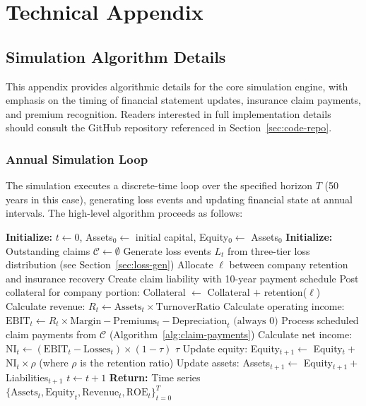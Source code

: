 \documentclass[11pt,letterpaper]{article}
\begin{document}



\pagebreak

\appendix
\section{Technical Appendix}

\subsection{Simulation Algorithm Details}

This appendix provides algorithmic details for the core simulation engine, with emphasis on the timing of financial statement updates, insurance claim payments, and premium recognition. Readers interested in full implementation details should consult the GitHub repository referenced in Section~\ref{sec:code-repo}.

\subsubsection{Annual Simulation Loop}

The simulation executes a discrete-time loop over the specified horizon $T$ (50 years in this case), generating loss events and updating financial state at annual intervals. The high-level algorithm proceeds as follows:

\begin{algorithmic}[1]
\State \textbf{Initialize:} $t \gets 0$, Assets$_0 \gets$ initial capital, Equity$_0 \gets$ Assets$_0$
\State \textbf{Initialize:} Outstanding claims $\mathcal{C} \gets \emptyset$
    \State Generate loss events $L_t$ from three-tier loss distribution (see Section~\ref{sec:loss-gen})
        \State Allocate $\ell$ between company retention and insurance recovery
        \State Create claim liability with 10-year payment schedule
        \State Post collateral for company portion: Collateral $\gets$ Collateral $+$ retention($\ell$)
    \EndFor
    \State Calculate revenue: $R_t \gets \text{Assets}_t \times \text{TurnoverRatio}$
    \State Calculate operating income: $\text{EBIT}_t \gets R_t \times \text{Margin} - \text{Premiums}_t - \text{Depreciation}_t \text{ (always 0)}$
    \State Process scheduled claim payments from $\mathcal{C}$ (Algorithm~\ref{alg:claim-payments})
    \State Calculate net income: $\text{NI}_t \gets (\text{EBIT}_t - \text{Losses}_t) \times (1 - \tau)$  $\tau$ 
    \State Update equity: Equity$_{t+1} \gets$ Equity$_t +$ NI$_t \times \rho$ (where $\rho$ is the retention ratio)
    \State Update assets: Assets$_{t+1} \gets$ Equity$_{t+1} +$ Liabilities$_{t+1}$
    \State $t \gets t + 1$
\EndWhile
\State \textbf{Return:} Time series $\{\text{Assets}_t, \text{Equity}_t, \text{Revenue}_t, \text{ROE}_t\}_{t=0}^{T}$
\end{algorithmic}
\end{document}
